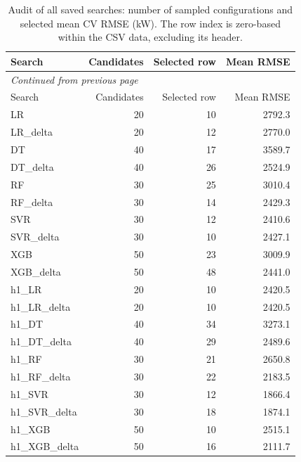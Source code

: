 \begingroup\small\setlength{\tabcolsep}{4pt}
\begin{longtable}{lrrr}
\caption{Audit of all saved searches: number of sampled configurations and selected mean CV RMSE (kW). The row index is zero-based within the CSV data, excluding its header.}\label{tab:search_inventory}\\
\toprule
Search & Candidates & Selected row & Mean RMSE \\
\midrule\endfirsthead
\multicolumn{4}{l}{\small\itshape Continued from previous page}\\\toprule
Search & Candidates & Selected row & Mean RMSE \\
\midrule\endhead\bottomrule\endfoot
LR & \num{20} & \num{10} & \num{2792.3} \\
LR\_delta & \num{20} & \num{12} & \num{2770.0} \\
DT & \num{40} & \num{17} & \num{3589.7} \\
DT\_delta & \num{40} & \num{26} & \num{2524.9} \\
RF & \num{30} & \num{25} & \num{3010.4} \\
RF\_delta & \num{30} & \num{14} & \num{2429.3} \\
SVR & \num{30} & \num{12} & \num{2410.6} \\
SVR\_delta & \num{30} & \num{10} & \num{2427.1} \\
XGB & \num{50} & \num{23} & \num{3009.9} \\
XGB\_delta & \num{50} & \num{48} & \num{2441.0} \\
h1\_LR & \num{20} & \num{10} & \num{2420.5} \\
h1\_LR\_delta & \num{20} & \num{10} & \num{2420.5} \\
h1\_DT & \num{40} & \num{34} & \num{3273.1} \\
h1\_DT\_delta & \num{40} & \num{29} & \num{2489.6} \\
h1\_RF & \num{30} & \num{21} & \num{2650.8} \\
h1\_RF\_delta & \num{30} & \num{22} & \num{2183.5} \\
h1\_SVR & \num{30} & \num{12} & \num{1866.4} \\
h1\_SVR\_delta & \num{30} & \num{18} & \num{1874.1} \\
h1\_XGB & \num{50} & \num{10} & \num{2515.1} \\
h1\_XGB\_delta & \num{50} & \num{16} & \num{2111.7} \\
\end{longtable}\endgroup
